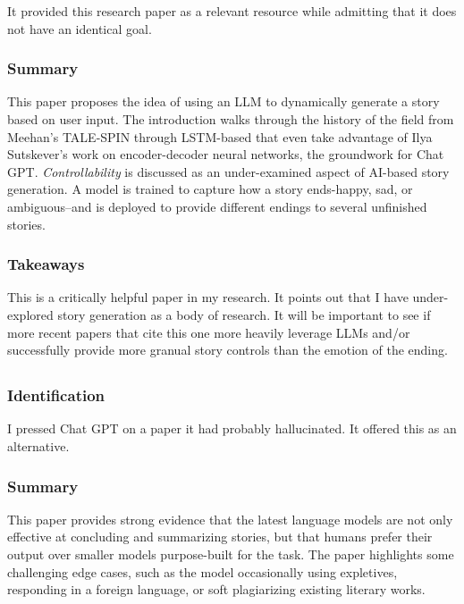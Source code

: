 \documentclass[
	letterpaper, %
]{jdf}
\begin{document}
It provided this research paper as a relevant resource while admitting that it does not have an identical goal.

\subsubsection{Summary}
This paper proposes the idea of using an LLM to dynamically generate a story based on user input. The introduction walks through the history of the field from Meehan's TALE-SPIN through LSTM-based that even take advantage of Ilya Sutskever's work on encoder-decoder neural networks, the groundwork for Chat GPT. \textit{Controllability} is discussed as an under-examined aspect of AI-based story generation. A model is trained to capture how a story ends-happy, sad, or ambiguous–and is deployed to provide different endings to several unfinished stories.

\subsubsection{Takeaways}
This is a critically helpful paper in my research. It points out that I have under-explored story generation as a body of research. It will be important to see if more recent papers that cite this one more heavily leverage LLMs and/or successfully provide more granual story controls than the emotion of the ending.

\subsection{}
\subsubsection{Identification}
I pressed Chat GPT on a paper it had probably hallucinated. It offered this as an alternative.

\subsubsection{Summary}
This paper provides strong evidence that the latest language models are not only effective at concluding and summarizing stories, but that humans prefer their output over smaller models purpose-built for the task. The paper highlights some challenging edge cases, such as the model occasionally using expletives, responding in a foreign language, or soft plagiarizing existing literary works.
\end{document}
